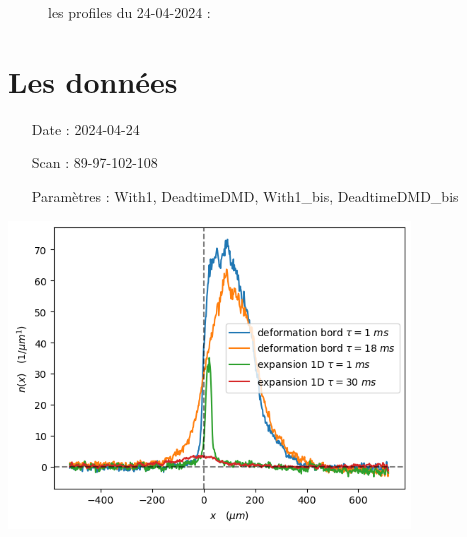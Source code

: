 \documentclass[a3, 10pt,twoside]{article}          %
\theoremstyle{plain}
\theoremstyle{definition}
\theoremstyle{remark}
\theoremstyle{definition} %
\begin{document}
	\begin{figure}[H]
        \centering
	\caption{les profiles du 24-04-2024 : }
        \label{fig:donnes}
    \end{figure}
    
    
    
	\section{Les données } 
	
	\begin{minipage}[b]{0.45\textwidth} 
    \begin{itemize}
        \item[Date :] 2024-04-24
        \item[Scan :] 89-97-102-108
        \item[Paramètres :] With1, DeadtimeDMD, With1\_bis, DeadtimeDMD\_bis
    \end{itemize}

    \vspace{1em} %
    
        \centering
        \includegraphics[width=0.8\textwidth]{Figures/donnees_24-04-2024} %

    \vspace{1em} %
    

\end{minipage}
\end{document}
